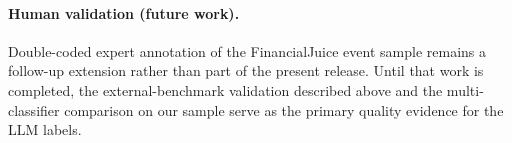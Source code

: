 \paragraph{Human validation (future work).} Double-coded expert
annotation of the FinancialJuice event sample remains a follow-up
extension rather than part of the present release. Until that work
is completed, the external-benchmark validation described above and
the multi-classifier comparison on our sample serve as the primary
quality evidence for the LLM labels.
